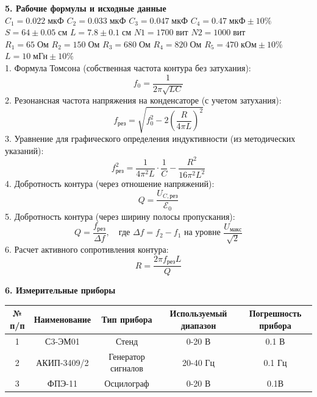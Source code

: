 \documentclass[12pt,fleqn]{article}
\begin{document}
\begin{justify}
    \textbf{5. Рабочие формулы и исходные данные} \\
    $C_1 = 0.022 \; \text{мкФ} $
    $C_2 = 0.033 \; \text{мкФ} $
    $C_3 = 0.047 \; \text{мкФ} $
    $C_4 = 0.47 \; \text{мкФ} \pm 10\% $ \\
    $S = 64 \pm 0.05 \; \text{см} $
    $L = 7.8 \pm 0.1 \; \text{см} $
    $N1 = 1700 \; \text{вит} $
    $N2 = 1000 \; \text{вит} $ \\
    $R_1 = 65 \; \text{Ом} $
    $R_2 = 150 \; \text{Ом} $
    $R_3 = 680 \; \text{Ом} $
    $R_4 = 820 \; \text{Ом} $
    $R_5 = 470 \; \text{кОм} \pm 10\% $
    $L = 10 \; \text{мГн} \pm 10\% $ \\
    1. Формула Томсона (собственная частота контура без затухания):
    \[ f_0 = \frac{1}{2\pi\sqrt{LC}} \]
    2. Резонансная частота напряжения на конденсаторе (с учетом затухания):
    \[ f_{\text{рез}} = \sqrt{f_0^2 - 2\left(\frac{R}{4\pi L}\right)^2} \]
    3. Уравнение для графического определения индуктивности (из методических указаний):
    \[ f_{\text{рез}}^2 = \frac{1}{4\pi^2 L} \cdot \frac{1}{C} - \frac{R^2}{16\pi^2 L^2} \]
    4. Добротность контура (через отношение напряжений):
    \[ Q = \frac{U_{C,\text{рез}}}{\mathcal{E}_0} \]
    5. Добротность контура (через ширину полосы пропускания):
    \[ Q = \frac{f_{\text{рез}}}{\Delta f}, \quad \text{где } \Delta f = f_2 - f_1 \text{ на уровне } \frac{U_{\text{макс}}}{\sqrt{2}} \]
    6. Расчет активного сопротивления контура:
    \[ R = \frac{2\pi f_{\text{рез}} L}{Q} \]
\end{justify}


\begin{flushleft}
    \textbf{6. Измерительные приборы} \\
    \begin{table}[h]
    \centering
    \renewcommand{\arraystretch}{1.5}
    \begin{tabular}{|c|c|c|c|c|}
        \hline
        № п/п & Наименование & Тип прибора & Используемый диапазон & Погрешность прибора\\
        \hline
        1 & С3-ЭМ01 & Стенд & 0-20 В & 0.1 В \\
        \hline
        2 & АКИП-3409/2 & Генератор сигналов & 20-40 Гц & 0.1 Гц \\
        \hline
        3 & ФПЭ-11 & Осцилограф & 0-20 В & 0.1В \\
        \hline
    \end{tabular}
    \end{table}
\end{flushleft}
\end{document}
